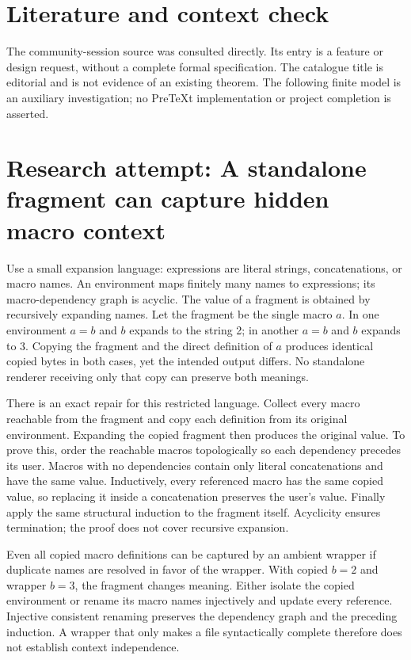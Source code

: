 \documentclass[11pt]{article}
\begin{document}
\section{Literature and context check}
The community-session source was consulted directly. Its entry is a feature or design request, without a complete formal specification. The catalogue title is editorial and is not evidence of an existing theorem. The following finite model is an auxiliary investigation; no PreTeXt implementation or project completion is asserted.
\section{Research attempt: A standalone fragment can capture hidden macro context}
Use a small expansion language: expressions are literal strings, concatenations, or macro names. An environment maps finitely many names to expressions; its macro-dependency graph is acyclic. The value of a fragment is obtained by recursively expanding names. Let the fragment be the single macro $a$. In one environment $a=b$ and $b$ expands to the string 2; in another $a=b$ and $b$ expands to 3. Copying the fragment and the direct definition of $a$ produces identical copied bytes in both cases, yet the intended output differs. No standalone renderer receiving only that copy can preserve both meanings.

There is an exact repair for this restricted language. Collect every macro reachable from the fragment and copy each definition from its original environment. Expanding the copied fragment then produces the original value. To prove this, order the reachable macros topologically so each dependency precedes its user. Macros with no dependencies contain only literal concatenations and have the same value. Inductively, every referenced macro has the same copied value, so replacing it inside a concatenation preserves the user's value. Finally apply the same structural induction to the fragment itself. Acyclicity ensures termination; the proof does not cover recursive expansion.

Even all copied macro definitions can be captured by an ambient wrapper if duplicate names are resolved in favor of the wrapper. With copied $b=2$ and wrapper $b=3$, the fragment changes meaning. Either isolate the copied environment or rename its macro names injectively and update every reference. Injective consistent renaming preserves the dependency graph and the preceding induction. A wrapper that only makes a file syntactically complete therefore does not establish context independence.
\end{document}
